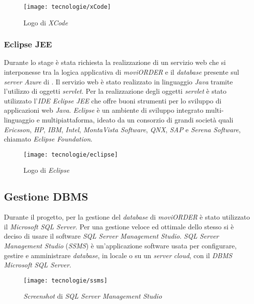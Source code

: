 \begin{figure}[!h] 
    \centering 
    \texttt{[image: tecnologie/xCode]} 
    \caption{Logo di \textit{XCode}}
\end{figure}

\subsubsection{Eclipse JEE}

Durante lo stage è stata richiesta la realizzazione di un servizio web che si interponesse tra la logica applicativa di \textit{moviORDER} e il \textit{database} presente sul \textit{server Azure} di \visione{}. Il servizio web è stato realizzato in linguaggio \textit{Java} tramite l'utilizzo di oggetti \textit{servlet}. Per la realizzazione degli oggetti \textit{servlet} è stato utilizzato l'\textit{IDE Eclipse JEE} che offre buoni strumenti per lo sviluppo di applicazioni web \textit{Java}. \textit{Eclipse} è un ambiente di sviluppo integrato multi-linguaggio e multipiattaforma, ideato da un consorzio di grandi società quali \textit{Ericsson}, \textit{HP}, \textit{IBM}, \textit{Intel}, \textit{MontaVista Software}, \textit{QNX}, \textit{SAP} e \textit{Serena Software}, chiamato \textit{Eclipse Foundation}.

\begin{figure}[!h] 
    \centering 
    \texttt{[image: tecnologie/eclipse]} 
    \caption{Logo di \textit{Eclipse}}
\end{figure}

\subsection{Gestione DBMS}

Durante il progetto, per la gestione del \textit{database} di \textit{moviORDER} è stato utilizzato il  \textit{Microsoft SQL Server}. Per una gestione veloce ed ottimale dello stesso si è deciso di usare il software \textit{SQL Server Management Studio}. \textit{SQL Server Management Studio} (\textit{SSMS}) è un'applicazione software usata per configurare, gestire e amministrare \textit{database}, in locale o su un \textit{server} \textit{cloud}, con il \textit{DBMS Microsoft SQL Server}. 

\begin{figure}[!h] 
    \centering 
    \texttt{[image: tecnologie/ssms]} 
    \caption{\textit{Screenshot} di \textit{SQL Server Management Studio}}
\end{figure}

